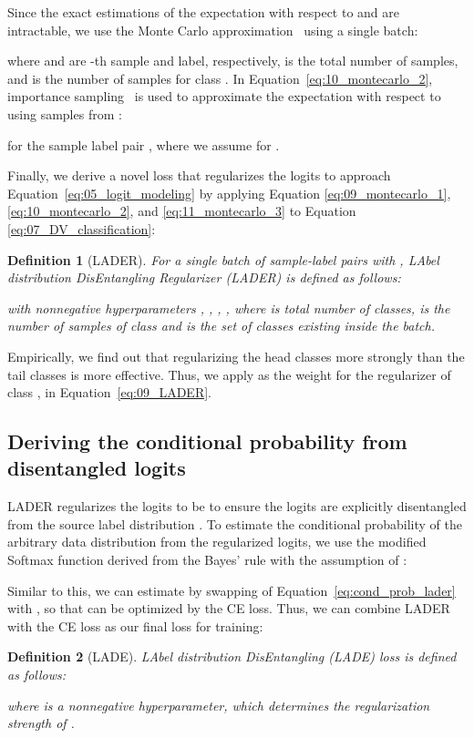 \documentclass[final]{cvpr}
\newtheorem{definition}{Definition}[section]
\begin{document}
Since the exact estimations of the expectation with respect to  and  are intractable, we use the Monte Carlo approximation~\cite{rubinstein2016simulation} using a single batch:


where  and  are -th sample and label, respectively,  is the total number of samples, and  is the number of samples for class .
In Equation~\ref{eq:10_montecarlo_2}, importance sampling~\cite{kahn1955use} is used to approximate the expectation with respect to  using samples from :

for the sample label pair , where we assume  for .

Finally, we derive a novel loss that regularizes the logits to approach Equation~\ref{eq:05_logit_modeling} by applying Equation \ref{eq:09_montecarlo_1}, \ref{eq:10_montecarlo_2}, and \ref{eq:11_montecarlo_3} to Equation \ref{eq:07_DV_classification}:
\begin{definition}[LADER]
\label{def:lader}
For a single batch of sample-label pairs  with , LAbel distribution DisEntangling Regularizer (LADER) is defined as follows:


with nonnegative hyperparameters , , , , where  is total number of classes,  is the number of samples of class  and  is the set of classes existing inside the batch.
\end{definition}
Empirically, we find out that regularizing the head classes more strongly than the tail classes is more effective.
Thus, we apply  as the weight for the regularizer of class ,  in Equation~\ref{eq:09_LADER}.

\subsection{Deriving the conditional probability from disentangled logits}\label{subsec:3_3_cond_prob}
LADER regularizes the logits to be  to ensure the logits are explicitly disentangled from the source label distribution .
To estimate the conditional probability  of the arbitrary data distribution  from the regularized logits, we use the modified Softmax function derived from the Bayes’ rule with the assumption of :


Similar to this, we can estimate  by swapping  of Equation~\ref{eq:cond_prob_lader} with , so that  can be optimized by the CE loss.
Thus, we can combine LADER with the CE loss as our final loss for training:
\begin{definition}[LADE]
\label{def:lade}
LAbel distribution DisEntangling (LADE) loss is defined as follows:


where  is a nonnegative hyperparameter, which determines the regularization strength of .
\end{definition}
\end{document}
